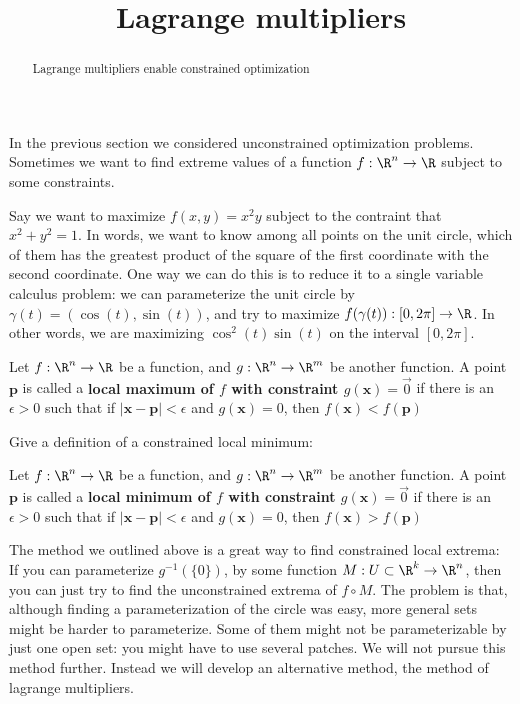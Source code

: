 \documentclass{ximera}
\title{Lagrange multipliers}
\begin{document}
	\begin{abstract}
		Lagrange multipliers enable constrained optimization
	\end{abstract}\maketitle
	
	In the previous section we considered unconstrained optimization problems.  Sometimes we want to find extreme values of a function $f:\R^n \to \R$
	subject to some constraints.  
	
	\begin{example}
		Say we want to maximize $f(x,y) = x^2y$ subject to the contraint that $x^2+y^2=1$.  In  words, we want to know among all points on the unit circle,
		which of them has the greatest product of the square of the first coordinate with the second coordinate.  One way we can do this is to reduce it to a single variable
		calculus problem:  we can parameterize the unit circle by $\gamma(t) = (\cos(t),\sin(t))$, and try to maximize $f(\gamma(t)):[0,2\pi] \to \R$. In other words, we
		are maximizing $\cos^2(t)\sin(t)$ on the interval $[0,2\pi]$.
	\end{example}
	
	\begin{definition}
		Let $f:\R^n \to \R$ be a function, and $g:\R^n \to \R^m$ be another function.  A point $\mathbf{p}$ is called a \textbf{local maximum of $f$ with constraint 
		$g(\mathbf{x}) = \vec{0}$} if there is an $\epsilon>0$ such that if $|\mathbf{x}-\mathbf{p}| < \epsilon$ and $g(\mathbf{x}) = 0$, 
		then $f(\mathbf{x})<f(\mathbf{p})$
	\end{definition}
	
	Give a definition of a constrained local minimum:
	
	\begin{free-response}
		Let $f:\R^n \to \R$ be a function, and $g:\R^n \to \R^m$ be another function.  A point $\mathbf{p}$ is called a \textbf{local minimum of $f$ with constraint 
		$g(\mathbf{x}) = \vec{0}$} if there is an $\epsilon>0$ such that if $|\mathbf{x}-\mathbf{p}| < \epsilon$ and $g(\mathbf{x}) = 0$, 
		then $f(\mathbf{x})>f(\mathbf{p})$
	\end{free-response}
	
	The method we outlined above is a great way to find constrained local extrema: If you can parameterize $g^{-1}(\{0\})$, by some function
	 $M: U \subset \R^k \to \R^n$, 
	then you can just try to find the unconstrained extrema  of $f\circ M$.  The problem is that, although finding a parameterization of the circle was easy, more general
	sets might be harder to parameterize.  Some of them might not be parameterizable by just one open set:  you might have to use several patches.  We will not pursue
	this method further.  Instead we will develop an alternative method, the method of lagrange multipliers.
	
\end{document}
